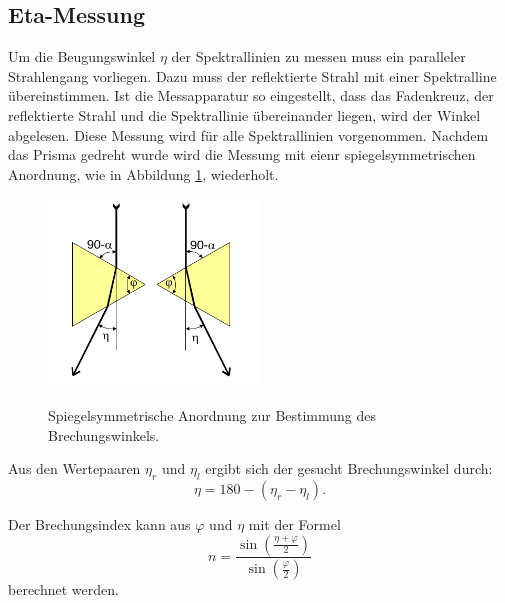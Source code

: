 \subsection{Eta-Messung}
Um die Beugungswinkel $\eta$ der Spektrallinien zu messen muss ein
paralleler Strahlengang vorliegen. Dazu muss der reflektierte
Strahl mit einer Spektralline übereinstimmen. Ist die Messapparatur
so eingestellt, dass das Fadenkreuz, der reflektierte Strahl und die
Spektrallinie übereinander liegen, wird der Winkel abgelesen.
Diese Messung wird für alle Spektrallinien vorgenommen.
Nachdem das Prisma gedreht wurde wird die Messung mit eienr
spiegelsymmetrischen Anordnung, wie in Abbildung
\ref{fig:spiegel}, wiederholt.

\begin{figure}[H]
  \centering
  \includegraphics[height=5cm]{spiegel.png}
  \caption{Spiegelsymmetrische Anordnung zur Bestimmung des Brechungswinkels.}
  \label{fig:spiegel}
  \cite{skript}
\end{figure}

Aus den Wertepaaren $\eta_r$ und $\eta_l$ ergibt sich der gesucht
Brechungswinkel durch:
\begin{equation}
  \eta=180-(\eta_r - \eta_l).
  \label{eqn:eta}
\end{equation}

Der Brechungsindex kann aus $\varphi$ und $\eta$ mit der Formel
\begin{equation}
  n=\frac{\sin{(\frac{\eta+\varphi}{2})}}{\sin{(\frac{\varphi}{2})}}
  \label{eqn:brechungsindex}
\end{equation}
berechnet werden.
